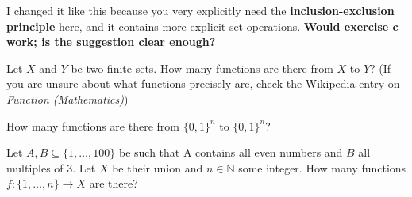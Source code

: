 \documentclass[a4paper,10pt,landscape,twocolumn]{scrartcl}
\begin{document}
\begin{exercise}
	\begin{mycomment}
	I changed it like this because you very explicitly need the \textbf{inclusion-exclusion principle} here, and it contains more explicit set operations. \textbf{Would exercise c work; is the suggestion clear enough?}
	\end{mycomment}
	
	\begin{subex}[1pt]
		Let $X$ and $Y$ be two finite sets. How many functions are there from $X$ to $Y$?
		 (If you are unsure about what functions precisely are, check the \href{https://en.wikipedia.org/wiki/Function_(mathematics)}{Wikipedia} entry on \emph{Function (Mathematics)})
	\end{subex}
	
	\begin{subex}[1pt]
	How many functions are there from $\{0,1\}^n$ to $\{0,1\}^n$?	
	\end{subex}
	
	\begin{subex}[1pt]
		Let $A, B \subseteq \{1, \dots, 100\}$ be such that A contains all even numbers and $B$ all multiples of 3. Let $X$ be their union and $n\in \mathbb{N}$ some integer. How many functions $f: \{1, \dots, n\} \to X$ are there?
	\end{subex}
	
\end{exercise}
\end{document}
